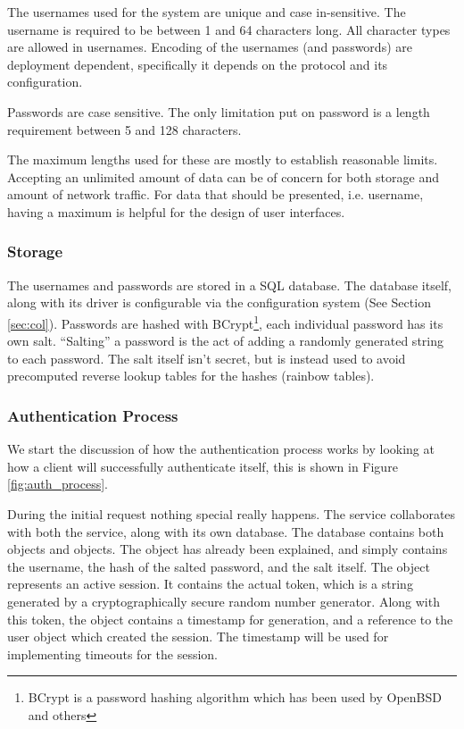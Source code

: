The usernames used for the system are unique and case in-sensitive. The
username is required to be between 1 and 64 characters long. All character
types are allowed in usernames. Encoding of the usernames (and passwords) are
deployment dependent, specifically it depends on the protocol and its
configuration.

Passwords are case sensitive. The only limitation put on password is a length
requirement between 5 and 128 characters.

The maximum lengths used for these are mostly to establish reasonable limits.
Accepting an unlimited amount of data can be of concern for both storage and
amount of network traffic. For data that should be presented, i.e. username,
having a maximum is helpful for the design of user interfaces.

\subsubsection*{Storage}

The usernames and passwords are stored in a SQL database. The database itself,
along with its driver is configurable via the configuration system (See
Section \ref{sec:col}). Passwords are hashed with
BCrypt\footnote{BCrypt is a password hashing algorithm which has been used
by OpenBSD and others}\cite{provos1999future}, each individual password has
its own salt. ``Salting'' a password is the act of adding a randomly
generated string to each password. The salt itself isn't secret,
but is instead used to avoid precomputed reverse lookup tables for
the hashes (rainbow tables).

\subsubsection*{Authentication Process}

We start the discussion of how the authentication process works by looking at
how a client will successfully authenticate itself, this is shown in Figure
\ref{fig:auth_process}.

During the initial request nothing special really happens. The \security
service collaborates with both the \bcrypt service, along with its own
database. The database contains both  objects and 
objects. The  object has already been explained, and simply contains
the username, the hash of the salted password, and the salt itself. The
 object represents an active session. It contains the actual
token, which is a string generated by a cryptographically secure random number
generator. Along with this token, the object contains a timestamp for
generation, and a reference to the user object which created the session. The
timestamp will be used for implementing timeouts for the session.

